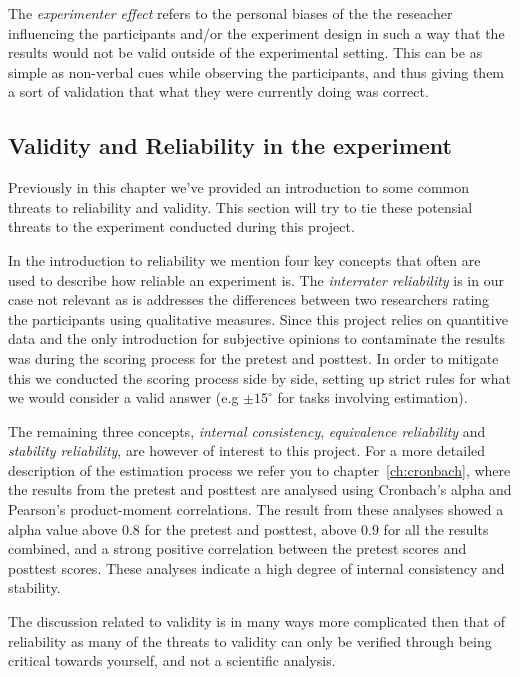 	\bigskip\noindent
	The \textit{experimenter effect} refers to the personal biases of the the reseacher influencing the participants and/or the experiment design in such a way that the results would not be valid outside of the experimental setting. This can be as simple as non-verbal cues while observing the participants, and thus giving them a sort of validation that what they were currently doing was correct. 
	
	
\subsection{Validity and Reliability in the experiment}
	Previously in this chapter we've provided an introduction to some common threats to reliability and validity. This section will try to tie these potensial threats to the experiment conducted during this project. 
	
	\bigskip\noindent
	In the introduction to reliability we mention four key concepts that often are used to describe how reliable an experiment is. The \textit{interrater reliability} is in our case not relevant as is addresses the differences between two researchers rating the participants using qualitative measures. Since this project relies on quantitive data and the only introduction for subjective opinions to contaminate the results was during the scoring process for the pretest and posttest. In order to mitigate this we conducted the scoring process side by side, setting up strict rules for what we would consider a valid answer (e.g $\pm 15^{\circ}$ for tasks involving estimation).
	
	\bigskip\noindent
	The remaining three concepts, \textit{internal consistency}, \textit{equivalence reliability} and \textit{stability reliability}, are however of interest to this project. 
	For a more detailed description of the estimation process we refer you to chapter~\ref{ch:cronbach}, where the results from the pretest and posttest are analysed using Cronbach's alpha and Pearson's product-moment correlations. The result from these analyses showed a alpha value above $0.8$ for the pretest and posttest, above $0.9$ for all the results combined, and a strong positive correlation between the pretest scores and posttest scores. These analyses indicate a high degree of internal consistency and stability.
	
	\bigskip\noindent
	The discussion related to validity is in many ways more complicated then that of reliability as many of the threats to validity can only be verified through being critical towards yourself, and not a scientific analysis. 
	
